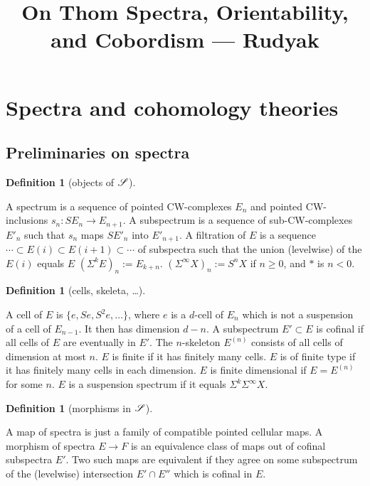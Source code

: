\documentclass[11pt]{article}
\title{On Thom Spectra, Orientability, and Cobordism\small{ --- Rudyak}}
\renewcommand{\comment}{}
\theoremstyle{plain}
\theoremstyle{definition}
\newtheorem{defn}[thm]{Definition}
\begin{document}
\ifx\VIEWtheWHOLEdocument\undefined
\else
\tableofcontents
\fi

\setcounter{section}{1}
\section{Spectra and \lparen co\rparen homology theories}
\subsection{Preliminaries on spectra}
\comment{
\begin{defn}[objects of $\mathscr{S}$]\hfil
\begin{itemise}
\itm[(a)]A spectrum is a sequence of pointed CW-complexes $E_n$ and pointed
CW-inclusions $s_n:SE_n\to E_{n+1}$.
\itm[(b)]A subspectrum is a sequence of sub-CW-complexes $E'_n$ such that $s_n$
maps $SE'_n$ into $E'_{n+1}$.
\itm[(c)]A filtration of $E$ is a sequence 
$\cdots\subset E(i)\subset E(i+1)\subset\cdots$ of subspectra such that the
union (levelwise) of the $E(i)$ equals $E$
\itm[(d)]$(\Sigma^kE)_n:=E_{k+n}$.
\itm[(e)]$(\Sigma^\infty X)_n:=S^nX$ if $n\geq0$, and $*$ is $n<0$.
\end{itemise}
\end{defn}
\begin{defn}[cells, skeleta, \ldots]\hfil
\begin{itemise}
\itm[(a)]
A cell of $E$ is $\{e,Se,S^2e,\ldots\}$, where $e$ is a $d$-cell of $E_n$ which
is not a suspension of a cell of $E_{n-1}$. It then has dimension $d-n$.
\itm[(b)]A subspectrum $E'\subset E$ is cofinal if all cells of $E$ are
eventually in $E'$.
\itm[(c)]The $n$-skeleton $E^{(n)}$ consists of all cells of dimension at most
$n$.
\itm[(d)]$E$ is finite if it has finitely many cells.
\itm[(e)]$E$ is of finite type if it has finitely many cells in each dimension.
\itm[(f)]$E$ is finite dimensional if $E=E^{(n)}$ for some $n$.
\itm[(g)]$E$ is a suspension spectrum if it equals $\Sigma^k\Sigma^\infty X$.
\end{itemise}
\end{defn}
\begin{defn}[morphisms in $\mathscr{S}$]\hfil
\begin{itemise}
\itm[(a)]A map of spectra is just a family of compatible pointed cellular maps.
\itm[(b)]A morphism of spectra $E\to F$ is an equivalence class of maps out of
cofinal subspectra $E'$. Two such maps are equivalent if they agree on some
subspectrum of the (levelwise) intersection $E'\cap E''$ which is cofinal in
$E$.
\end{itemise}

\end{defn}}
\end{document}
